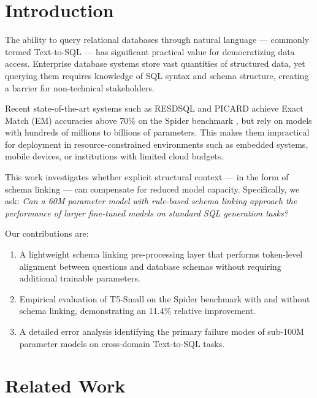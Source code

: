 \documentclass[conference]{IEEEtran}
\begin{document}
\section{Introduction}

The ability to query relational databases through natural language — commonly termed Text-to-SQL — has significant practical value for democratizing data access. Enterprise database systems store vast quantities of structured data, yet querying them requires knowledge of SQL syntax and schema structure, creating a barrier for non-technical stakeholders.

Recent state-of-the-art systems such as RESDSQL \cite{li2023resdsql} and PICARD \cite{scholak2021picard} achieve Exact Match (EM) accuracies above 70\% on the Spider benchmark \cite{yu2018spider}, but rely on models with hundreds of millions to billions of parameters. This makes them impractical for deployment in resource-constrained environments such as embedded systems, mobile devices, or institutions with limited cloud budgets.

This work investigates whether explicit structural context — in the form of schema linking — can compensate for reduced model capacity. Specifically, we ask: \textit{Can a 60M parameter model with rule-based schema linking approach the performance of larger fine-tuned models on standard SQL generation tasks?}

Our contributions are:
\begin{enumerate}
    \item A lightweight schema linking pre-processing layer that performs token-level alignment between questions and database schemas without requiring additional trainable parameters.
    \item Empirical evaluation of T5-Small \cite{raffel2020t5} on the Spider benchmark with and without schema linking, demonstrating an 11.4\% relative improvement.
    \item A detailed error analysis identifying the primary failure modes of sub-100M parameter models on cross-domain Text-to-SQL tasks.
\end{enumerate}

\section{Related Work}
\end{document}
